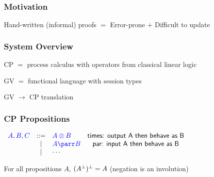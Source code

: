 \documentclass{beamer}
\newcommand{\altt}{~|~}
\let\oldframetitle\frametitle
\renewcommand{\frametitle}[1]{
  \oldframetitle{#1}\vspace{-3.5cm}
}
\begin{document}
\begin{frame}
\frametitle{Motivation}
Hand-written (informal) proofs $=$ Error-prone $+$ Difficult to update
\end{frame}

\begin{comment}
there has been a lot of activity in this area producing a variety of different
session-based type systems. many systems build on top of previous work adding
more complex features such as asynchronous, polymorphic and recursive session
types. extending informal proofs is error-prone and difficult because it is
not always clear which parts of a system's metatheory is affected by a
change. a formalised system would reduce likelihood of errors in the proofs
and aid extension since the theorem prover would highlight changes to the
metatheory
\end{comment}

\begin{frame}
\frametitle{System Overview}
CP $=$ process calculus with operators from classical linear logic

GV $=$ functional language with session types

GV $\to$ CP translation
\end{frame}

\begin{comment}
the formalisation i present here is an encoding of a system in the Coq proof
assistant. it is based on a two-tier system providing a logical foundation for
understanding session types. A high-level overview of the system is as
follows: we have a process calculus CP with operators from classical linear
logic, a high-level functional language GV with session types, and a
translation from GV to CP which interprets operators in classical linear logic
as session types.
\end{comment}

\begin{frame}
\frametitle{CP Propositions}
\begin{math}
\begin{array}{rclc}
    \tp{A,B,C} & \bnf
          & \tp{A \otimes B} & \key{times: output A then behave as B}\\
          & \altt & \tp{A \parr B} & \key{par: input A then behave as B}\\
          & \altt & \cdots
\end{array}
\end{math}

For all propositions $A$, $(A^\bot)^\bot = A$ (negation is an
involution)
\end{frame}
\end{document}
